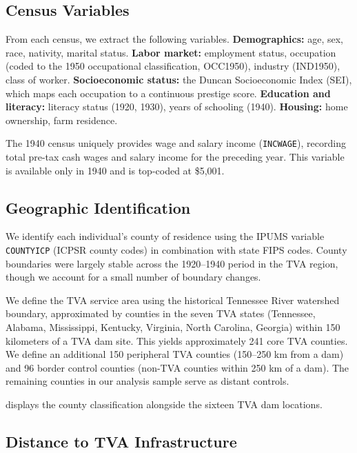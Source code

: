 \documentclass[12pt]{article}
\begin{document}
\subsection{Census Variables}

From each census, we extract the following variables. \textbf{Demographics:} age, sex, race, nativity, marital status. \textbf{Labor market:} employment status, occupation (coded to the 1950 occupational classification, OCC1950), industry (IND1950), class of worker. \textbf{Socioeconomic status:} the Duncan Socioeconomic Index (SEI), which maps each occupation to a continuous prestige score. \textbf{Education and literacy:} literacy status (1920, 1930), years of schooling (1940). \textbf{Housing:} home ownership, farm residence.

The 1940 census uniquely provides wage and salary income (\texttt{INCWAGE}), recording total pre-tax cash wages and salary income for the preceding year. This variable is available only in 1940 and is top-coded at \$5,001.

\subsection{Geographic Identification}

We identify each individual's county of residence using the IPUMS variable \texttt{COUNTYICP} (ICPSR county codes) in combination with state FIPS codes. County boundaries were largely stable across the 1920--1940 period in the TVA region, though we account for a small number of boundary changes.

We define the TVA service area using the historical Tennessee River watershed boundary, approximated by counties in the seven TVA states (Tennessee, Alabama, Mississippi, Kentucky, Virginia, North Carolina, Georgia) within 150 kilometers of a TVA dam site. This yields approximately 241 core TVA counties. We define an additional 150 peripheral TVA counties (150--250 km from a dam) and 96 border control counties (non-TVA counties within 250 km of a dam). The remaining counties in our analysis sample serve as distant controls.

 displays the county classification alongside the sixteen TVA dam locations.

\subsection{Distance to TVA Infrastructure}
\end{document}
